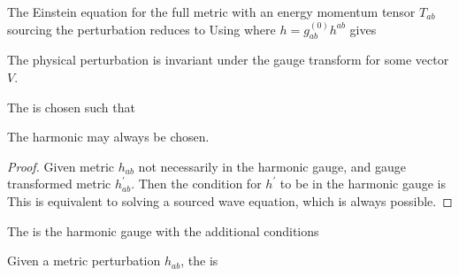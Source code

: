 \documentclass{article}
\begin{document}
\begin{lemma}
The Einstein equation for the full metric with an energy momentum tensor $T_{ab}$ sourcing the perturbation reduces to 
Using 
where $h = g_{ab}^{(0)} h^{ab}$ gives 
\end{lemma}

\begin{lemma}
The physical perturbation is invariant under the gauge transform 
for some vector $V$. 
\end{lemma}

\begin{definition}
The  is chosen such that 
\end{definition}

\begin{prop}
The harmonic may always be chosen.
\end{prop}
\begin{proof}
Given metric $h_{ab}$ not necessarily in the harmonic gauge, and gauge transformed metric $h^\prime_{ab}$. Then the condition for $h^\prime$ to be in the harmonic gauge is 
This is equivalent to solving a sourced wave equation, which is always possible. 
\end{proof}

\begin{definition}
The  is the harmonic gauge with the additional conditions 
\end{definition}

\begin{definition}
Given a metric perturbation $h_{ab}$, the  is 
\end{definition}
\end{document}
